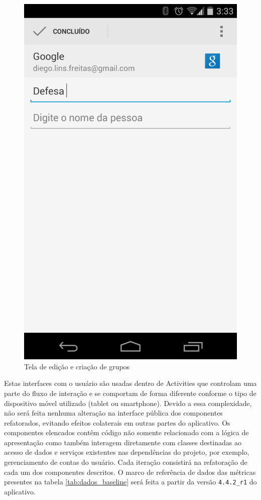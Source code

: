 \begin{figure}[!h]
\begin{minipage}{.5\textwidth}
	\includegraphics[scale=0.25]{img/contacts_edit.png}
	\caption{Tela de edição e criação de grupos} 
	\label{fig:groups_edit}
\end{minipage}
\end{figure}

Estas interfaces com o usuário são usadas dentro de Activities que controlam uma
parte do fluxo de interação e se comportam de forma diferente conforme o tipo de dispositivo
móvel utilizado (tablet ou smartphone). Devido a essa complexidade, não será
feita nenhuma alteração na interface pública dos componentes refatorados, evitando efeitos colaterais em
outras partes do aplicativo. Os componentes elencados contêm código não somente
relacionado com a lógica de apresentação como também interagem diretamente com classes destinadas ao acesso
de dados e serviços existentes nas dependências do projeto, por exemplo,
gerenciamento de contas do usuário.  Cada iteração consistirá na refatoração de
cada um dos componentes descritos. O marco de referência de dados das métricas presentes na tabela \ref{tab:dados_baseline} será feita a partir da
versão \verb|4.4.2_r1| do aplicativo.

